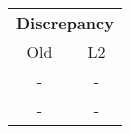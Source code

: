 \begin{tabular}{cc}
\toprule
\multicolumn{2}{c}{\textbf{Discrepancy}} \\
Old &  L2 \\
\midrule
- & - \\
- & - \\
\bottomrule
\end{tabular}
